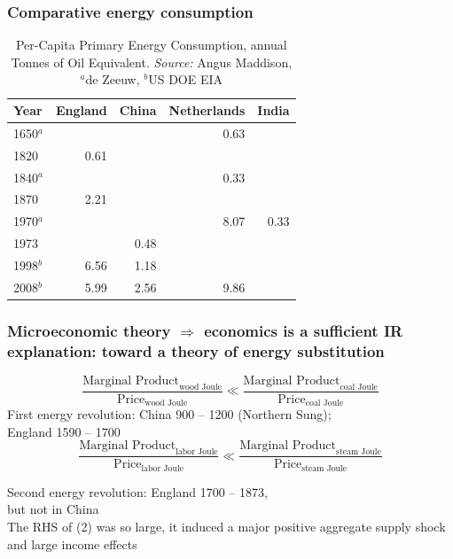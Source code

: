 \documentclass[final]{beamer}
\begin{document}
\begin{frame}
\frametitle{Comparative energy consumption}
\begin{table}[htb]
	\centering
	\begin{tabular}{lrrrr}
	\hline
	Year&England&China&Netherlands&India\\
	\hline \hline
	1650$^a$&&&0.63&  \\
	1820&0.61&&&\\
	1840$^a$ &&&0.33& \\
	1870&2.21&\\
	1970$^a$ &&&8.07&0.33 \\
	1973&&0.48&&\\
	1998$^b$&6.56&1.18\\
	2008$^b$&5.99&2.56&9.86&  \\
	\hline
	\end{tabular}
	\caption{Per-Capita Primary Energy Consumption,	annual Tonnes of Oil Equivalent. \textit{Source:} Angus Maddison, $^a$de Zeeuw, $^b$US DOE EIA}
	\label{tab:maddison_energy}
	\end{table}
\end{frame}	

\begin{frame}
\frametitle{Microeconomic theory $\Rightarrow$ economics is a sufficient IR explanation: toward a theory of energy substitution} 
\pause
\small{
		\begin{equation}
		\label{eq:mrp}
		\frac{\text{Marginal Product}_{\text{wood Joule}}}{\text{Price}_{\text{wood Joule}}} \ll \frac{\text{Marginal Product}_{\text{coal Joule}}}{\text{Price}_{\text{coal Joule}}}
		\end{equation}
		\pause \vspace*{-0.2in}
		\center First energy revolution: China 900 -- 1200 (Northern Sung)\pause;\\ England 1590 -- 1700
		\pause \vspace*{0.2in}
		\begin{equation}
		\label{eq:mrp2}
		\frac{\text{Marginal Product}_{\text{labor Joule}}}{\text{Price}_{\text{labor Joule}}} \ll \frac{\text{Marginal Product}_{\text{steam Joule}}}{\text{Price}_{\text{steam Joule}}}
		\end{equation}
		\pause \vspace*{-0.2in}
		\begin{center} 
		Second energy revolution: England 1700 -- 1873\pause,\\ but not in China\\
		\pause \vspace*{0.2in}
		The RHS of (2) was so large, it induced a major positive aggregate supply shock \pause and large income effects
		\end{center}
}
\end{frame}
\end{document}
